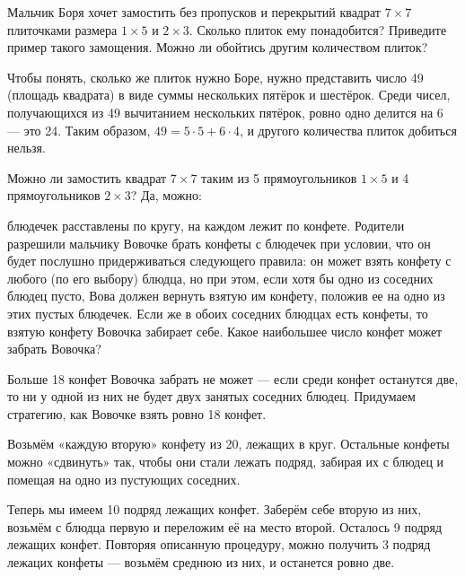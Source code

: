 \begin{itemize}
	\itC Мальчик Боря хочет замостить без пропусков и перекрытий квадрат $7\times 7$ плиточками размера $1\times 5$ и $2\times 3.$ Сколько плиток ему понадобится? Приведите пример такого замощения.  Можно ли обойтись другим количеством плиток?
	
	\itr Чтобы понять, сколько же плиток нужно Боре, нужно представить число 49 (площадь квадрата) в виде суммы нескольких пятёрок и шестёрок. Среди чисел, получающихся из 49 вычитанием нескольких пятёрок, ровно одно делится на 6 — это 24. Таким образом, $49 = 5 \cdot 5 + 6 \cdot 4$, и другого количества плиток добиться нельзя.
	
	Можно ли замостить квадрат $7 \times 7$ таким из 5 прямоугольников $1 \times 5$ и 4 прямоугольников $2 \times 3$? Да, можно:
	
	\begin{center}  \end{center}
	
\end{itemize}


\begin{itemize}

	 блюдечек расставлены по кругу, на каждом лежит по конфете. Родители разрешили мальчику Вовочке брать конфеты с блюдечек при условии, что он будет послушно придерживаться следующего правила: он может взять конфету с любого (по его выбору) блюдца, но при этом, если хотя бы одно из соседних блюдец пусто, Вова должен вернуть взятую им конфету, положив ее на одно из этих пустых блюдечек. Если же в обоих соседних блюдцах есть конфеты, то взятую конфету Вовочка забирает себе. Какое наибольшее число конфет может забрать Вовочка?
	
	\itr Больше 18 конфет Вовочка забрать не может — если среди конфет останутся две, то ни у одной из них не будет двух занятых соседних блюдец. Придумаем стратегию, как Вовочке взять ровно 18 конфет.
	
	Возьмём «каждую вторую» конфету из 20, лежащих в круг. Остальные конфеты можно «сдвинуть» так, чтобы они стали лежать подряд, забирая их с блюдец и помещая на одно из пустующих соседних.
	
	Теперь мы имеем 10 подряд лежащих конфет. Заберём себе вторую из них, возьмём с блюдца первую и переложим её на место второй. Осталось 9 подряд лежащих конфет. Повторяя описанную процедуру, можно получить 3 подряд лежацих конфеты — возьмём среднюю из них, и останется ровно две.

\end{itemize}